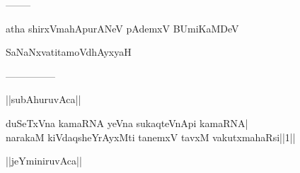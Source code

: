 \documentclass{article}
\begin{document}
\begin{center}
--------
\end{center}

\begin{center}
atha shirxVmahApurANeV pAdemxV BUmiKaMDeV
\end{center}

\begin{center}
SaNaNxvatitamoVdhAyxyaH
\end{center}

\begin{center}
---------------
\end{center}

\begin{center}
||subAhuruvAca||
\end{center}

duSeTxVna kamaRNA yeVna sukaqteVnApi kamaRNA|\\
narakaM kiVdaqsheYrAyxMti tanemxV tavxM vakutxmahaRsi||1||\\

\begin{center}
||jeYminiruvAca||
\end{center}
\end{document}
